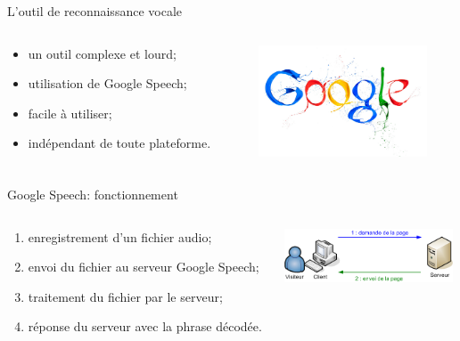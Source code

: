 \documentclass{beamer}
\begin{document}
\begin{frame}{L'outil de reconnaissance vocale}

	\begin{columns}[c]
	
	\begin{column}{5cm}
   		\begin{itemize}
			\item un outil complexe et lourd;
			\item utilisation de Google Speech;
			\item facile à utiliser;
			\item indépendant de toute plateforme.
		\end{itemize}
  	\end{column}
	\begin{column}{5cm}
		\includegraphics[width=5cm]{google-logo}
  	\end{column}
	
	\end{columns}

\end{frame}

\begin{frame}{Google Speech: fonctionnement}

	\begin{columns}[c]
	
	\begin{column}{5cm}
   		\begin{enumerate}
			\item enregistrement d'un fichier audio;
			\item envoi du fichier au serveur Google Speech;
			\item traitement du fichier par le serveur;
			\item réponse du serveur avec la phrase décodée.
		\end{enumerate}
  	\end{column}
	\begin{column}{5cm}
		\includegraphics[width=5cm]{http}
  	\end{column}
	
	\end{columns}

\end{frame}
\end{document}
